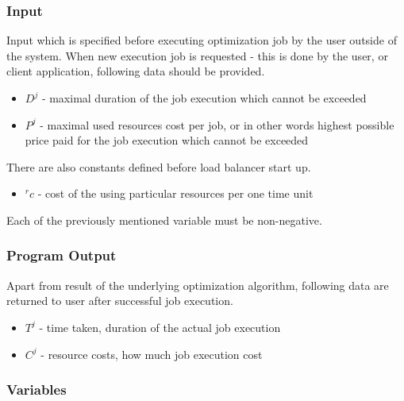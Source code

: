 \subsubsection{Input}
Input which is specified before executing optimization job by the user outside of the system.
When new execution job is requested - this is done by the user, or client application,
following data should be provided.
\begin{itemize}
	\item $D^{j}$ - maximal duration of the job execution which cannot be exceeded
	\item $P^{j}$ - maximal used resources cost per job, or in other words highest possible price paid for the job execution which cannot be exceeded
\end{itemize} 
There are also constants defined before load balancer start up.
\begin{itemize}
	\item ${}^{r}c$ - cost of the using particular resources per one time unit
\end{itemize}
Each of the previously mentioned variable must be non-negative.

\subsubsection{Program Output}
Apart from result of the underlying optimization algorithm,
following data are returned to user after successful job execution.

\begin{itemize}
	\item $T^{j}$ - time taken, duration of the actual job execution
	\item $C^{j}$ - resource costs, how much job execution cost
\end{itemize}

\subsubsection{Variables}

